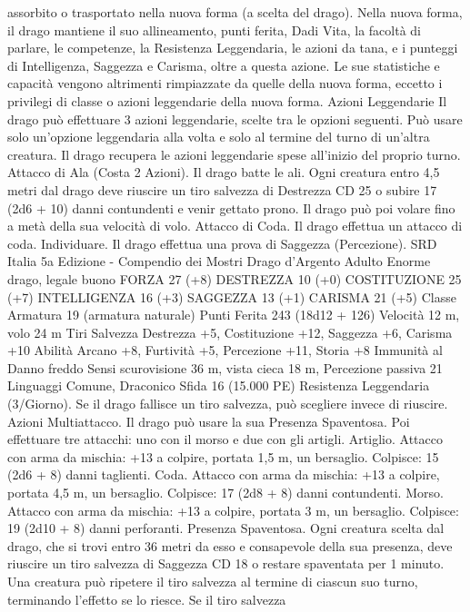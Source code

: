 \begin{multicols}{2}
assorbito o trasportato nella nuova forma (a scelta del drago).
Nella nuova forma, il drago mantiene il suo allineamento, punti
ferita, Dadi Vita, la facoltà di parlare, le competenze, la Resistenza
Leggendaria, le azioni da tana, e i punteggi di Intelligenza, Saggezza
e Carisma, oltre a questa azione. Le sue statistiche e capacità
vengono altrimenti rimpiazzate da quelle della nuova forma, eccetto i
privilegi di classe o azioni leggendarie della nuova forma.
Azioni Leggendarie
Il drago può effettuare 3 azioni leggendarie, scelte tra le opzioni
seguenti. Può usare solo un’opzione leggendaria alla volta e solo
al termine del turno di un’altra creatura. Il drago recupera le
azioni leggendarie spese all’inizio del proprio turno.
Attacco di Ala (Costa 2 Azioni). Il drago batte le ali. Ogni
creatura entro 4,5 metri dal drago deve riuscire un tiro salvezza
di Destrezza CD 25 o subire 17 (2d6 + 10) danni contundenti e
venir gettato prono. Il drago può poi volare fino a metà della sua
velocità di volo.
Attacco di Coda. Il drago effettua un attacco di coda.
Individuare. Il drago effettua una prova di Saggezza
(Percezione).
SRD Italia 5a Edizione - Compendio dei Mostri
Drago d’Argento Adulto
Enorme drago, legale buono
FORZA 27 (+8)
DESTREZZA 10 (+0)
COSTITUZIONE 25 (+7)
INTELLIGENZA 16 (+3)
SAGGEZZA 13 (+1)
CARISMA 21 (+5)
Classe Armatura 19 (armatura naturale)
Punti Ferita 243 (18d12 + 126)
Velocità 12 m, volo 24 m
Tiri Salvezza Destrezza +5, Costituzione +12, Saggezza +6,
Carisma +10
Abilità Arcano +8, Furtività +5, Percezione +11, Storia +8
Immunità al Danno freddo
Sensi scurovisione 36 m, vista cieca 18 m, Percezione passiva 21
Linguaggi Comune, Draconico
Sfida 16 (15.000 PE)
Resistenza Leggendaria (3/Giorno). Se il drago fallisce un tiro
salvezza, può scegliere invece di riuscire.
Azioni
Multiattacco. Il drago può usare la sua Presenza Spaventosa. Poi
effettuare tre attacchi: uno con il morso e due con gli artigli.
Artiglio. Attacco con arma da mischia: +13 a colpire, portata 1,5
m, un bersaglio.
Colpisce: 15 (2d6 + 8) danni taglienti.
Coda. Attacco con arma da mischia: +13 a colpire, portata 4,5
m, un bersaglio.
Colpisce: 17 (2d8 + 8) danni contundenti.
Morso. Attacco con arma da mischia: +13 a colpire, portata 3 m,
un bersaglio.
Colpisce: 19 (2d10 + 8) danni perforanti.
Presenza Spaventosa. Ogni creatura scelta dal drago, che si trovi
entro 36 metri da esso e consapevole della sua presenza, deve
riuscire un tiro salvezza di Saggezza CD 18 o restare spaventata per
1 minuto. Una creatura può ripetere il tiro salvezza al termine di
ciascun suo turno, terminando l’effetto se lo riesce. Se il tiro salvezza

\end{multicols}
